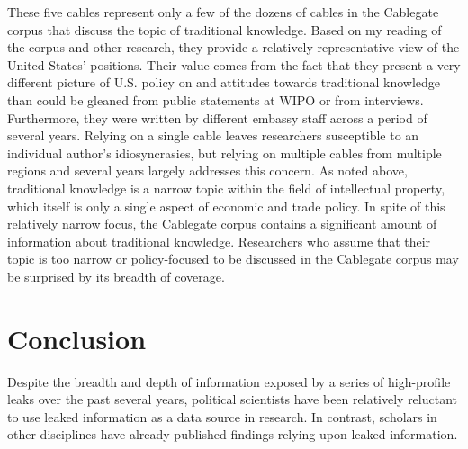 \documentclass[12pt]{article}
\begin{document}

These five cables represent only a few of the dozens of cables in the Cablegate corpus that discuss 
the topic of 
traditional knowledge. Based on my reading of the corpus and other research, they 
provide a relatively representative 
view of the United States' positions. Their value comes from the fact that they present a very different 
picture of U.S. policy 
on and attitudes towards traditional knowledge than could be gleaned from public statements at WIPO or 
from interviews. Furthermore, they were written by different embassy staff 
across a period of 
several years. Relying on a single cable leaves researchers susceptible to an 
individual author's idiosyncrasies, but relying on multiple cables from multiple regions and 
several years largely addresses this concern. As noted above, traditional knowledge is a narrow topic 
within the field of intellectual property, which itself is only a single aspect of economic and 
trade policy. In spite of this relatively narrow focus, the Cablegate corpus contains a significant 
amount of information about traditional knowledge. Researchers who assume that their topic is too 
narrow or policy-focused to be discussed in the Cablegate corpus may be surprised by its breadth of coverage.

\section{Conclusion}

Despite the breadth and depth of information exposed by a series of high-profile leaks over the past several years, 
political scientists have been relatively reluctant to use leaked information as a data source in research. 
In contrast, scholars in other disciplines have already published findings relying upon leaked information. 
\end{document}

